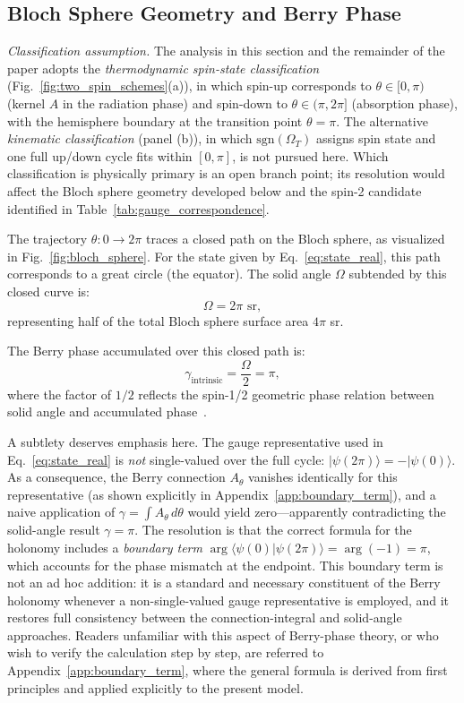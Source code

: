 \documentclass[%
 reprint,
 amsmath,amssymb,
 aps,
 prb,
]{revtex4-2}
\numberwithin{equation}{section}
\theoremstyle{definition}
\theoremstyle{remark}
\begin{document}
\subsection{Bloch Sphere Geometry and Berry Phase}
\label{sec:Berry_phase}

\textit{Classification assumption.} The analysis in this section and the remainder of the paper adopts the \emph{thermodynamic spin-state classification} (Fig.~\ref{fig:two_spin_schemes}(a)), in which spin-up corresponds to $\theta \in [0,\pi)$ (kernel $A$ in the radiation phase) and spin-down to $\theta \in (\pi, 2\pi]$ (absorption phase), with the hemisphere boundary at the transition point $\theta = \pi$. The alternative \emph{kinematic classification} (panel (b)), in which $\mathrm{sgn}(\Omega_T)$ assigns spin state and one full up/down cycle fits within $[0,\pi]$, is not pursued here. Which classification is physically primary is an open branch point; its resolution would affect the Bloch sphere geometry developed below and the spin-2 candidate identified in Table~\ref{tab:gauge_correspondence}.

The trajectory $\theta: 0 \to 2\pi$ traces a closed path on the Bloch sphere, as visualized in Fig.~\ref{fig:bloch_sphere}. For the state given by Eq.~\eqref{eq:state_real}, this path corresponds to a great circle (the equator). The solid angle $\Omega$ subtended by this closed curve is:
\begin{equation}
\Omega = 2\pi \text{ sr},
\label{eq:solid_angle}
\end{equation}
representing half of the total Bloch sphere surface area $4\pi$ sr.

The Berry phase accumulated over this closed path is:
\begin{equation}
\gamma_{\text{intrinsic}} = \frac{\Omega}{2} = \pi,
\label{eq:berry_intrinsic}
\end{equation}
where the factor of $1/2$ reflects the spin-1/2 geometric phase relation between solid angle and accumulated phase~\cite{Berry1984,Aharonov1987}.

A subtlety deserves emphasis here. The gauge representative used in Eq.~\eqref{eq:state_real} is \emph{not} single-valued over the full cycle: $|\psi(2\pi)\rangle = -|\psi(0)\rangle$. As a consequence, the Berry connection $A_\theta$ vanishes identically for this representative (as shown explicitly in Appendix~\ref{app:boundary_term}), and a naive application of $\gamma = \int A_\theta\,d\theta$ would yield zero---apparently contradicting the solid-angle result $\gamma = \pi$. The resolution is that the correct formula for the holonomy includes a \emph{boundary term} $\arg\langle\psi(0)|\psi(2\pi)\rangle = \arg(-1) = \pi$, which accounts for the phase mismatch at the endpoint. This boundary term is not an ad hoc addition: it is a standard and necessary constituent of the Berry holonomy whenever a non-single-valued gauge representative is employed, and it restores full consistency between the connection-integral and solid-angle approaches. Readers unfamiliar with this aspect of Berry-phase theory, or who wish to verify the calculation step by step, are referred to Appendix~\ref{app:boundary_term}, where the general formula is derived from first principles and applied explicitly to the present model.
\end{document}
